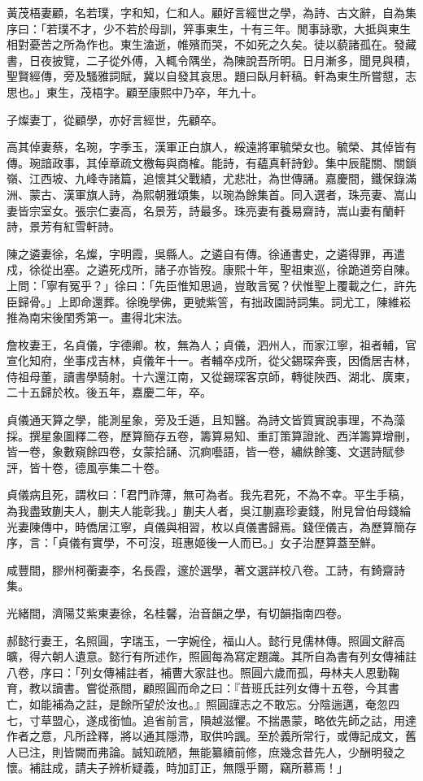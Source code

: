 \begin{pinyinscope}
黃茂梧妻顧，名若璞，字和知，仁和人。顧好言經世之學，為詩、古文辭，自為集序曰：「若璞不才，少不若於母訓，笄事東生，十有三年。閒事詠歌，大抵與東生相對憂苦之所為作也。東生溘逝，帷殯而哭，不如死之久矣。徒以藐諸孤在。發藏書，日夜披覽，二子從外傅，入輒令隅坐，為陳說吾所明。日月漸多，聞見與積，聖賢經傳，旁及騷雅詞賦，冀以自發其哀思。題曰臥月軒稿。軒為東生所嘗憇，志思也。」東生，茂梧字。顧至康熙中乃卒，年九十。

子燦妻丁，從顧學，亦好言經世，先顧卒。

高其倬妻蔡，名琬，字季玉，漢軍正白旗人，綏遠將軍毓榮女也。毓榮、其倬皆有傳。琬諳政事，其倬章疏文檄每與商榷。能詩，有蘊真軒詩鈔。集中辰龍關、關鎖嶺、江西坡、九峰寺諸篇，追懷其父戰績，尤悲壯，為世傳誦。嘉慶間，鐵保錄滿洲、蒙古、漢軍旗人詩，為熙朝雅頌集，以琬為餘集首。同入選者，珠亮妻、嵩山妻皆宗室女。張宗仁妻高，名景芳，詩最多。珠亮妻有養易齋詩，嵩山妻有蘭軒詩，景芳有紅雪軒詩。

陳之遴妻徐，名燦，字明霞，吳縣人。之遴自有傳。徐通書史，之遴得罪，再遣戍，徐從出塞。之遴死戍所，諸子亦皆歿。康熙十年，聖祖東巡，徐跪道旁自陳。上問：「寧有冤乎？」徐曰：「先臣惟知思過，豈敢言冤？伏惟聖上覆載之仁，許先臣歸骨。」上即命還葬。徐晚學佛，更號紫䇾，有拙政園詩詞集。詞尤工，陳維崧推為南宋後閨秀第一。畫得北宋法。

詹枚妻王，名貞儀，字德卿。枚，無為人；貞儀，泗州人，而家江寧，祖者輔，官宣化知府，坐事戍吉林，貞儀年十一。者輔卒戍所，從父錫琛奔喪，因僑居吉林，侍祖母董，讀書學騎射。十六還江南，又從錫琛客京師，轉徙陜西、湖北、廣東，二十五歸於枚。後五年，嘉慶二年，卒。

貞儀通天算之學，能測星象，旁及壬遁，且知醫。為詩文皆質實說事理，不為藻採。撰星象圖釋二卷，歷算簡存五卷，籌算易知、重訂策算證訛、西洋籌算增刪，皆一卷，象數窺餘四卷，女蒙拾誦、沉痾囈語，皆一卷，繡紩餘箋、文選詩賦參評，皆十卷，德風亭集二十卷。

貞儀病且死，謂枚曰：「君門祚薄，無可為者。我先君死，不為不幸。平生手稿，為我盡致蒯夫人，蒯夫人能彰我。」蒯夫人者，吳江蒯嘉珍妻錢，附見曾伯母錢綸光妻陳傳中，時僑居江寧，貞儀與相習，枚以貞儀書歸焉。錢侄儀吉，為歷算簡存序，言：「貞儀有實學，不可沒，班惠姬後一人而已。」女子治歷算蓋至鮮。

咸豐間，膠州柯蘅妻李，名長霞，邃於選學，著文選詳校八卷。工詩，有錡齋詩集。

光緒間，濟陽艾紫東妻徐，名桂馨，治音韻之學，有切韻指南四卷。

郝懿行妻王，名照圓，字瑞玉，一字婉佺，福山人。懿行見儒林傳。照圓文辭高曠，得六朝人遺意。懿行有所述作，照圓每為寫定題識。其所自為書有列女傳補註八卷，序曰：「列女傳補註者，補曹大家註也。照圓六歲而孤，母林夫人恩勤鞠育，教以讀書。嘗從燕間，顧照圓而命之曰：『昔班氏註列女傳十五卷，今其書亡，如能補為之註，是餘所望於汝也。』照圓謹志之不敢忘。分陰遄邁，奄忽四七，寸草盟心，遂成銜恤。追省前言，隕越滋懼。不揣愚蒙，略依先師之詁，用達作者之意，凡所詮釋，將以通其隱滯，取供吟諷。至於義所常行，或傳記成文，舊人已注，則皆闕而弗論。誠知疏陋，無能纂續前修，庶幾念昔先人，少酬明發之懷。補註成，請夫子辨析疑義，時加訂正，無隱乎爾，竊所慕焉！」


\end{pinyinscope}
